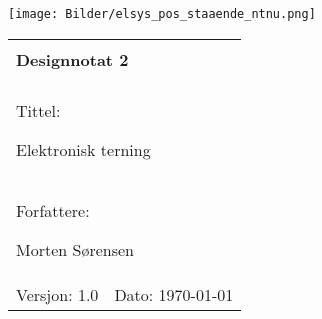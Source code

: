 \topmargin -1.5cm
\begin{minipage}[c]{0.15\textwidth}
\texttt{[image: Bilder/elsys\_pos\_staaende\_ntnu.png]}  
\end{minipage}
\begin{minipage}[c]{0.85\textwidth}

\renewcommand{\arraystretch}{1.7}
\large 
\begin{tabularx}{\textwidth}{|X|X|}
\hline
\multicolumn{2}{|l|}{} \\
\multicolumn{2}{|l|}{\huge \textbf{Designnotat 2}} \\
\multicolumn{2}{|l|}{}  \\
\hline
\multicolumn{2}{|l|}{Tittel: 

Elektronisk terning
} \\
\hline
\multicolumn{2}{|l|}{Forfattere: 

Morten Sørensen
} \\
\hline

Versjon: 1.0 & Dato: \today
\\
\hline 
\end{tabularx}
\end{minipage}
\normalsize
